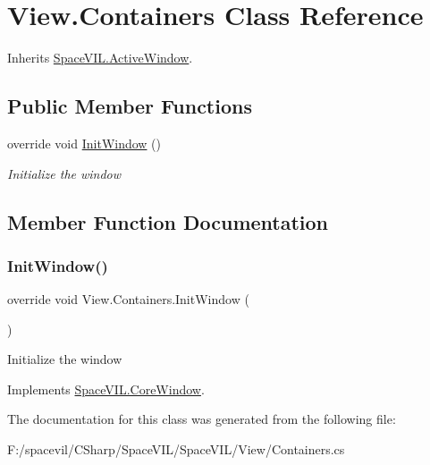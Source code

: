 \hypertarget{class_view_1_1_containers}{}\section{View.\+Containers Class Reference}
\label{class_view_1_1_containers}


Inherits \mbox{\hyperlink{class_space_v_i_l_1_1_active_window}{Space\+V\+I\+L.\+Active\+Window}}.

\subsection*{Public Member Functions}
\begin{DoxyCompactItemize}
\item 
override void \mbox{\hyperlink{class_view_1_1_containers_a78f0f1f1a35caf1cc7a1f4a9a9d159a2}{Init\+Window}} ()
\begin{DoxyCompactList}\small\item\em Initialize the window \end{DoxyCompactList}\end{DoxyCompactItemize}


\subsection{Member Function Documentation}
\mbox{\label{class_view_1_1_containers_a78f0f1f1a35caf1cc7a1f4a9a9d159a2}} 
\subsubsection{\texorpdfstring{Init\+Window()}{InitWindow()}}
{\footnotesize\ttfamily override void View.\+Containers.\+Init\+Window (\begin{DoxyParamCaption}{ }\end{DoxyParamCaption})\hspace{0.3cm}{\ttfamily [virtual]}}



Initialize the window 



Implements \mbox{\hyperlink{class_space_v_i_l_1_1_core_window_aa3cf4ac54d9651b1149584dc81042824}{Space\+V\+I\+L.\+Core\+Window}}.



The documentation for this class was generated from the following file\+:\begin{DoxyCompactItemize}
\item 
F\+:/spacevil/\+C\+Sharp/\+Space\+V\+I\+L/\+Space\+V\+I\+L/\+View/Containers.\+cs\end{DoxyCompactItemize}
